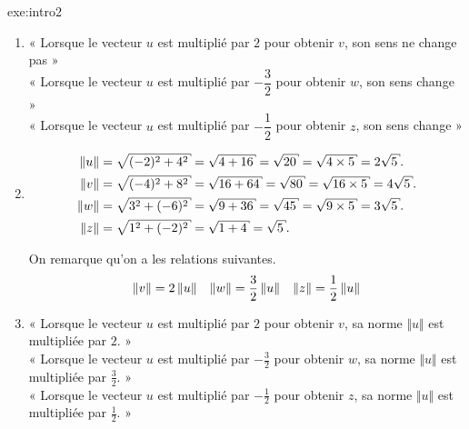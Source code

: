 {}{exe:intro2}{
	\begin{enumerate}
		\item
			\begin{center}
				« Lorsque le vecteur $u$ est multiplié par {\color{RED_E} $2$} pour obtenir $v$, son sens {\color{RED_E} ne change pas} » \\[10pt]
				« Lorsque le vecteur $u$ est multiplié par  {\color{RED_E} $-\dfrac32$} pour obtenir $w$, son sens {\color{RED_E} change} » \\[10pt]
				« Lorsque le vecteur $u$ est multiplié par  {\color{RED_E} $-\dfrac12$} pour obtenir $z$, son sens {\color{RED_E} change} »
			\end{center}
		\item
			\begin{align*}
				\norm{u} &= \sqrt{(-2)^2 + 4^2} = \sqrt{4 + 16} = \sqrt{20} = \sqrt{4 \times 5} = 2 \sqrt{5}. \\
				\norm{v} &= \sqrt{(-4)^2 + 8^2} = \sqrt{16 + 64} = \sqrt{80} = \sqrt{16 \times 5} = 4\sqrt{5}. \\
				\norm{w} &= \sqrt{3^2 + (-6)^2} = \sqrt{9 + 36} = \sqrt{45} = \sqrt{9 \times 5} = 3 \sqrt{5}. \\
				\norm{z} &= \sqrt{1^2 + (-2)^2} = \sqrt{1 + 4} = \sqrt{5}.
			\end{align*}
	
		On remarque qu'on a les relations suivantes.
			\begin{align*}
				\left\Vert v \right\Vert = 2 \left\Vert u \right\Vert && \left\Vert w \right\Vert = \dfrac32 \left\Vert u \right\Vert && \left\Vert z \right\Vert = \dfrac12 \left\Vert u \right\Vert
			\end{align*}
		\item
			\begin{center}
				« Lorsque le vecteur $u$ est multiplié par {\color{RED_E} $2$} pour obtenir $v$, sa norme $\Vert u\Vert$ est multipliée par {\color{RED_E} $2$}. » \\[10pt]
				« Lorsque le vecteur $u$ est multiplié par {\color{RED_E} $-\frac32$} pour obtenir $w$, sa norme $\Vert u\Vert$ est multipliée par {\color{RED_E} $\frac32$}. » \\[10pt]
				« Lorsque le vecteur $u$ est multiplié par {\color{RED_E} $-\frac12$} pour obtenir $z$, sa norme $\Vert u\Vert$ est multipliée par {\color{RED_E} $\frac12$}. »
			\end{center}
	\end{enumerate}
}


